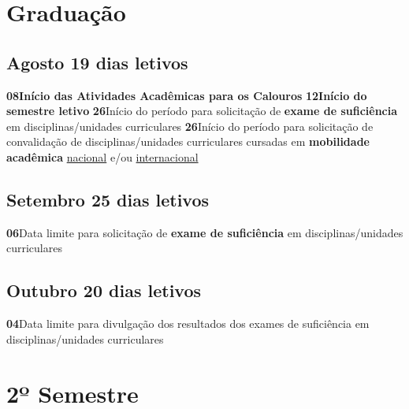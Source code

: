 \documentclass[thesis]{hmcposter}
\begin{document}
\begin{poster}
\section{\color{hmcorange}Graduação}\subsection{Agosto \hfill 19 dias letivos}\textbf{08}\qquad \textbf{Início das Atividades Acadêmicas para os Calouros} \newline \null\textbf{12}\qquad \textbf{Início do semestre letivo} \newline \null\textbf{26}\qquad Início do período para solicitação de \textbf{exame de suficiência} em disciplinas/unidades curriculares \newline \null\textbf{26}\qquad Início do período para solicitação de convalidação de disciplinas/unidades curriculares cursadas em \textbf{mobilidade acadêmica} \underline{nacional} e/ou \underline{internacional} \newline \null\subsection{Setembro \hfill 25 dias letivos}\textbf{06}\qquad Data limite para solicitação de \textbf{exame de suficiência} em disciplinas/unidades curriculares \newline \null\subsection{Outubro \hfill 20 dias letivos}\textbf{04}\qquad Data limite para divulgação dos resultados dos exames de suficiência em disciplinas/unidades curriculares \newline \null\vfill\null
\columnbreak
\section{\hfill \color{hmcorange}2º Semestre}

\end{poster}
\end{document}
